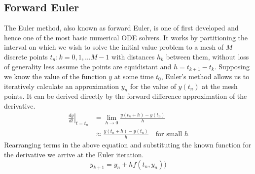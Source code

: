 \documentclass[11pt]{article}
\begin{document}
    \subsection{Forward Euler}
    The Euler method, also known as forward Euler, is one of first developed and hence one of the most basic numerical
    ODE solvers.
    It works by partitioning the interval on which we wish to solve the initial value problem to a mesh of $M$
    discrete points ${t_n: k=0,1,\dots M-1}$ with distances $h_k$ between them, without loss of generality less assume
    the points are equidistant and $h = t_{k+1} - t_k$.
    Supposing we know the value of the function $y$ at some time $t_0$, Euler's method allows us to iteratively
    calculate an approximation $y_n$ for the value of $y(t_n)$ at the mesh points.
    It can be derived directly by the forward difference approximation of the derivative.
    \begin{align}
        \left. \frac{dy}{dt} \right|_{t=t_n}  &= \lim_{h \to 0} \frac{y(t_n+h) - y(t_n)}{h} \\
        &\approx \frac{y(t_n+h) - y(t_n)}{ h} \quad \text{for small $h$}
    \end{align}
    Rearranging terms in the above equation and substituting the known function for the derivative we arrive at the
    Euler iteration.
    \begin{equation*}
        \label{eq:sol:euler}
        y_{k+1} = y_n + h f(t_n, y_n))
    \end{equation*}
\end{document}
